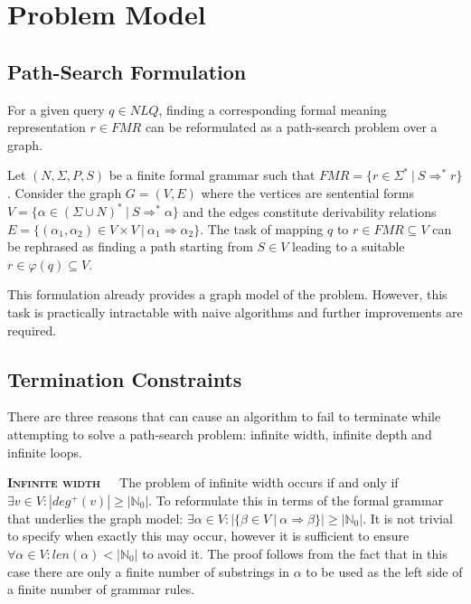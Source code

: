 \documentclass[12pt]{article}
\begin{document}
\section{Problem Model}

\subsection{Path-Search Formulation}

For a given query $q \in NLQ$, finding a corresponding formal meaning representation $r \in FMR$ can be reformulated as a path-search problem over a graph.

Let $(N, \Sigma, P, S)$ be a finite formal grammar such that $FMR = \{ r \in \Sigma^{*} \ | \ S \Rightarrow^{*} r \}$. Consider the graph $G = (V, E)$ where the vertices are sentential forms $V = \{ \alpha \in (\Sigma \cup N)^{*} \ | \ S \Rightarrow^{*} \alpha \}$ and the edges constitute derivability relations $E = \{ (\alpha_{1}, \alpha_{2}) \in V \times V \ | \ \alpha_{1} \Rightarrow \alpha_{2} \}$. The task of mapping $q$ to $r \in FMR \subseteq V$ can be rephrased as finding a path starting from $S \in V$ leading to a suitable $r \in \varphi(q) \subseteq V$.

This formulation already provides a graph model of the problem. However, this task is practically intractable with naive algorithms and further improvements are required.

\subsection{Termination Constraints}

There are three reasons that can cause an algorithm to fail to terminate while attempting to solve a path-search problem: infinite width, infinite depth and infinite loops.

\textbf{\textsc{Infinite width}}\ \ \ The problem of infinite width occurs if and only if $\exists v \in V : |deg^{+}(v)| \geq |\mathbb{N}_{0}| $. To reformulate this in terms of the formal grammar that underlies the graph model: $\exists \alpha \in V : |\{ \beta \in V \ | \ \alpha \Rightarrow \beta \}| \geq |\mathbb{N}_{0}|$. It is not trivial to specify when exactly this may occur, however it is sufficient to ensure $\forall \alpha \in V : len(\alpha) < |\mathbb{N}_{0}|$ to avoid it. The proof follows from the fact that in this case there are only a finite number of substrings in $\alpha$ to be used as the left side of a finite number of grammar rules.
\end{document}

